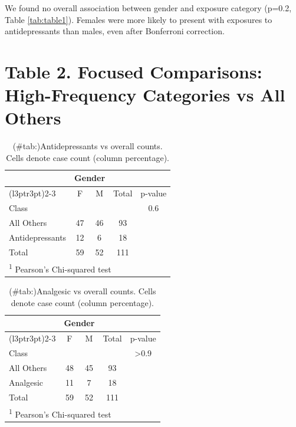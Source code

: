 \documentclass[
]{article}
\begin{document}
We found no overall association between gender and exposure category (p=0.2, Table \ref{tab:table1}). Females were more likely to present with exposures to antidepressants than males, even after Bonferroni correction.

\section{Table 2. Focused Comparisons: High-Frequency Categories vs All Others}\label{table-2.-focused-comparisons-high-frequency-categories-vs-all-others}

\begin{table}

\caption{(\#tab:\label{tab:antidepressants-v-others})Antidepressants vs overall counts. Cells denote case count (column percentage).}
\centering
\begin{tabular}[t]{lcccc}
\toprule
\multicolumn{1}{c}{ } & \multicolumn{2}{c}{Gender} & \multicolumn{2}{c}{ } \\
\cmidrule(l{3pt}r{3pt}){2-3}
 & F & M & Total & p-value\\
\midrule
Class &  &  &  & 0.6\\
\hspace{1em}All Others & 47 & 46 & 93 & \\
\hspace{1em}Antidepressants & 12 & 6 & 18 & \\
Total & 59 & 52 & 111 & \\
\bottomrule
\multicolumn{5}{l}{\rule{0pt}{1em}\textsuperscript{1} Pearson's Chi-squared test}\\
\end{tabular}
\end{table}

\begin{table}

\caption{(\#tab:\label{tab:analgesic-v-others})Analgesic vs overall counts. Cells denote case count (column percentage).}
\centering
\begin{tabular}[t]{lcccc}
\toprule
\multicolumn{1}{c}{ } & \multicolumn{2}{c}{Gender} & \multicolumn{2}{c}{ } \\
\cmidrule(l{3pt}r{3pt}){2-3}
 & F & M & Total & p-value\\
\midrule
Class &  &  &  & >0.9\\
\hspace{1em}All Others & 48 & 45 & 93 & \\
\hspace{1em}Analgesic & 11 & 7 & 18 & \\
Total & 59 & 52 & 111 & \\
\bottomrule
\multicolumn{5}{l}{\rule{0pt}{1em}\textsuperscript{1} Pearson's Chi-squared test}\\
\end{tabular}
\end{table}
\end{document}
